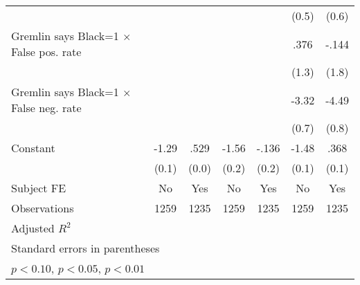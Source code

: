 \begin{table}[htbp]
\begin{tabular}{l*{6}{c}}
                &                  &                  &                  &                  &    (0.5)         &    (0.6)         \\
Gremlin says Black=1 $\times$ False pos. rate&                  &                  &                  &                  &     .376         &    -.144         \\
                &                  &                  &                  &                  &    (1.3)         &    (1.8)         \\
Gremlin says Black=1 $\times$ False neg. rate&                  &                  &                  &                  &    -3.32\sym{***}&    -4.49\sym{***}\\
                &                  &                  &                  &                  &    (0.7)         &    (0.8)         \\
Constant        &    -1.29\sym{***}&     .529\sym{***}&    -1.56\sym{***}&    -.136         &    -1.48\sym{***}&     .368\sym{***}\\
                &    (0.1)         &    (0.0)         &    (0.2)         &    (0.2)         &    (0.1)         &    (0.1)         \\
Subject FE      &       No         &      Yes         &       No         &      Yes         &       No         &      Yes         \\
\hline
Observations    &     1259         &     1235         &     1259         &     1235         &     1259         &     1235         \\
Adjusted \(R^{2}\)&                  &                  &                  &                  &                  &                  \\
\hline\hline
\multicolumn{7}{l}{\footnotesize Standard errors in parentheses}\\
\multicolumn{7}{l}{\footnotesize \sym{*} \(p<0.10\), \sym{**} \(p<0.05\), \sym{***} \(p<0.01\)}\\
\end{tabular}
\end{table}

